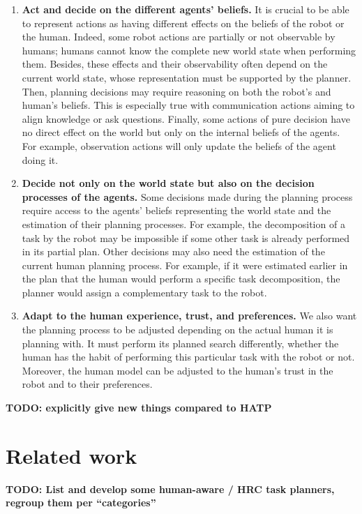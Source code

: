 \begin{enumerate}
    \item \textbf{Act and decide on the different agents' beliefs.} It is crucial to be able to represent actions as having different effects on the beliefs of the robot or the human. Indeed, some robot actions are partially or not observable by humans; humans cannot know the complete new world state when performing them. Besides, these effects and their observability often depend on the current world state, whose representation must be supported by the planner. Then, planning decisions may require reasoning on both the robot's and human's beliefs. This is especially true with communication actions aiming to align knowledge or ask questions. Finally, some actions of pure decision have no direct effect on the world but only on the internal beliefs of the agents. For example, observation actions will only update the beliefs of the agent doing it.

    \item \textbf{Decide not only on the world state but also on the decision processes of the agents.} Some decisions made during the planning process require access to the agents' beliefs representing the world state and the estimation of their planning processes. For example, the decomposition of a task by the robot may be impossible if some other task is already performed in its partial plan. Other decisions may also need the estimation of the current human planning process. For example, if it were estimated earlier in the plan that the human would perform a specific task decomposition, the planner would assign a complementary task to the robot.

    \item \textbf{Adapt to the human experience, trust, and preferences.} We also want the planning process to be adjusted depending on the actual human it is planning with. It must perform its planned search differently, whether the human has the habit of performing this particular task with the robot or not. Moreover, the human model can be adjusted to the human's trust in the robot and to their preferences.

\end{enumerate}

\textbf{TODO: explicitly give new things compared to HATP}

\section{Related work}

\textbf{TODO: List and develop some human-aware / HRC task planners, regroup them per ``categories''}

